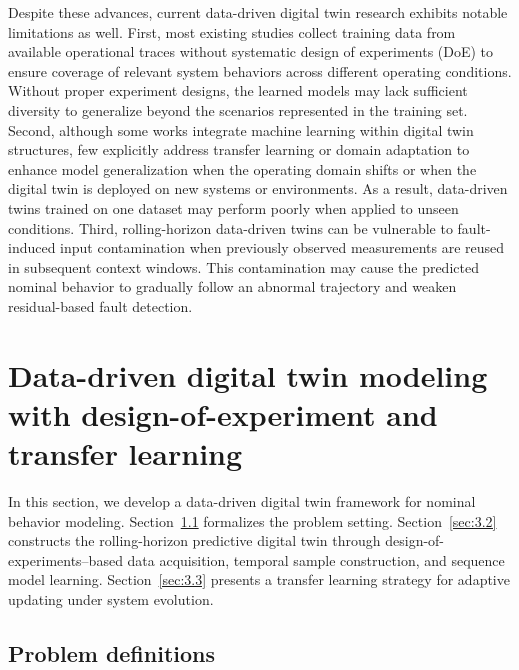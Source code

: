\documentclass[a4paper,10pt]{cas-sc}%
\newcommand{\roundtworev}[1]{\textcolor{roundtwored}{#1}}
\begin{document}
Despite these advances, current data-driven digital twin research exhibits notable limitations as well. First, most existing studies collect training data from available operational traces without systematic design of experiments (DoE) to ensure coverage of relevant system behaviors across different operating conditions. Without proper experiment designs, the learned models may lack sufficient diversity to generalize beyond the scenarios represented in the training set. Second, although some works integrate machine learning within digital twin structures, few explicitly address transfer learning or domain adaptation to enhance model generalization when the operating domain shifts or when the digital twin is deployed on new systems or environments. As a result, data-driven twins trained on one dataset may perform poorly when applied to unseen conditions. \roundtworev{Third, rolling-horizon data-driven twins can be vulnerable to fault-induced input contamination when previously observed measurements are reused in subsequent context windows. This contamination may cause the predicted nominal behavior to gradually follow an abnormal trajectory and weaken residual-based fault detection.}


\section{Data-driven digital twin modeling with design-of-experiment and transfer learning}\label{sec:3}

In this section, we develop a data-driven digital twin framework for nominal behavior modeling.
Section~\ref{sec:3.1} formalizes the problem setting.
Section~\ref{sec:3.2} constructs the rolling-horizon predictive digital twin through design-of-experiments--based data acquisition, temporal sample construction, and sequence model learning.
Section~\ref{sec:3.3} presents a transfer learning strategy for adaptive updating under system evolution.

\subsection{Problem definitions}\label{sec:3.1}
\end{document}
